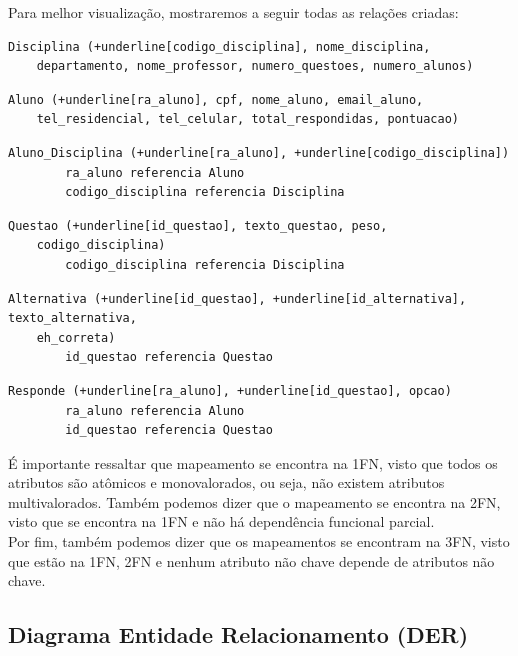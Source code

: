 \documentclass[12pt,a4paper]{article}
\begin{document}
Para melhor visualização, mostraremos a seguir todas as relações criadas:\\

\begin{Verbatim}[commandchars=+\[\]]
    Disciplina (+underline[codigo_disciplina], nome_disciplina,
    departamento, nome_professor, numero_questoes, numero_alunos)
\end{Verbatim}

\begin{Verbatim}[commandchars=+\[\]]
    Aluno (+underline[ra_aluno], cpf, nome_aluno, email_aluno, 
    tel_residencial, tel_celular, total_respondidas, pontuacao)
\end{Verbatim}

\begin{Verbatim}[commandchars=+\[\]]
    Aluno_Disciplina (+underline[ra_aluno], +underline[codigo_disciplina])
        ra_aluno referencia Aluno
        codigo_disciplina referencia Disciplina
\end{Verbatim}

\begin{Verbatim}[commandchars=+\[\]]
    Questao (+underline[id_questao], texto_questao, peso,
    codigo_disciplina)
        codigo_disciplina referencia Disciplina
\end{Verbatim}

\begin{Verbatim}[commandchars=+\[\]]
    Alternativa (+underline[id_questao], +underline[id_alternativa], texto_alternativa, 
    eh_correta)
        id_questao referencia Questao
\end{Verbatim}

\begin{Verbatim}[commandchars=+\[\]]
    Responde (+underline[ra_aluno], +underline[id_questao], opcao)
        ra_aluno referencia Aluno
        id_questao referencia Questao
\end{Verbatim}

É importante ressaltar que mapeamento se encontra na 1FN, visto que todos os atributos são atômicos e monovalorados, ou seja, não existem atributos multivalorados. Também podemos dizer que o mapeamento se encontra na 2FN, visto que se encontra na 1FN e não há dependência funcional parcial.\\

Por fim, também podemos dizer que os mapeamentos se encontram na 3FN, visto que estão na 1FN, 2FN e nenhum atributo não chave depende de atributos não chave.

\subsection{Diagrama Entidade Relacionamento (DER)}
\end{document}
